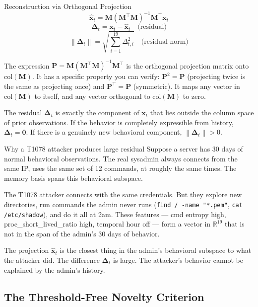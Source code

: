 \documentclass[11pt,a4paper]{article}
\newcommand{\norm}[1]{\left\lVert#1\right\rVert}
\newcommand{\mat}[1]{\mathbf{#1}}
\begin{document}
\begin{mathblock}{Reconstruction via Orthogonal Projection}
\[
\hat{\mathbf{x}}_t = \mat{M}(\mat{M}^\top \mat{M})^{-1} \mat{M}^\top \mathbf{x}_t \tag{1}
\]
\[
\boldsymbol{\Delta}_t = \mathbf{x}_t - \hat{\mathbf{x}}_t \quad \text{(residual)} \tag{2}
\]
\[
\norm{\boldsymbol{\Delta}_t} = \sqrt{\sum_{i=1}^{19} \Delta_{t,i}^2} \quad \text{(residual norm)} \tag{3}
\]
\end{mathblock}

The expression $\mat{P} = \mat{M}(\mat{M}^\top \mat{M})^{-1} \mat{M}^\top$ is the orthogonal projection matrix onto $\text{col}(\mat{M})$. It has a specific property you can verify: $\mat{P}^2 = \mat{P}$ (projecting twice is the same as projecting once) and $\mat{P}^\top = \mat{P}$ (symmetric). It maps any vector in $\text{col}(\mat{M})$ to itself, and any vector orthogonal to $\text{col}(\mat{M})$ to zero.

The residual $\boldsymbol{\Delta}_t$ is exactly the component of $\mathbf{x}_t$ that lies outside the column space of prior observations. If the behavior is completely expressible from history, $\boldsymbol{\Delta}_t = \mathbf{0}$. If there is a genuinely new behavioral component, $\norm{\boldsymbol{\Delta}_t} > 0$.

\begin{example}{Why a T1078 attacker produces large residual}
  Suppose a server has 30 days of normal behavioral observations. The real sysadmin always connects from the same IP, uses the same set of 12 commands, at roughly the same times. The memory basis spans this behavioral subspace.

  The T1078 attacker connects with the same credentials. But they explore new directories, run commands the admin never runs (\texttt{find / -name "*.pem"}, \texttt{cat /etc/shadow}), and do it all at 2am. These features — cmd entropy high, proc\_short\_lived\_ratio high, temporal hour off — form a vector in $\mathbb{R}^{19}$ that is not in the span of the admin's 30 days of behavior.

  The projection $\hat{\mathbf{x}}_t$ is the closest thing in the admin's behavioral subspace to what the attacker did. The difference $\boldsymbol{\Delta}_t$ is large. The attacker's behavior cannot be explained by the admin's history.
\end{example}

\subsection{The Threshold-Free Novelty Criterion}
\end{document}
